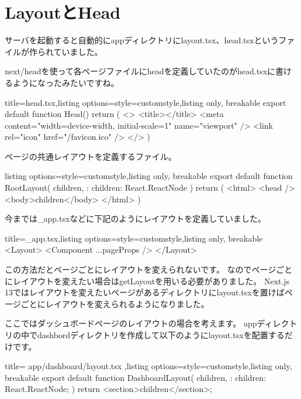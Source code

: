 \section{LayoutとHead}

サーバを起動すると自動的にappディレクトリにlayout.tsx、head.tsxというファイルが作られていました。

next/headを使って各ページファイルにheadを定義していたのがhead.tsxに書けるようになったみたいですね。

\begin{tcblisting}{title={head.tsx},listing options={style=customstyle},listing only, breakable}
  export default function Head() {
      return (
      <>
        <title></title>
        <meta content="width=device-width, initial-scale=1" name="viewport" />
        <link rel="icon" href="/favicon.ico" />
      </>
      )
    }
\end{tcblisting}



ページの共通レイアウトを定義するファイル。




\begin{tcblisting}{listing options={style=customstyle},listing only, breakable}
  export default function RootLayout({
      children,
    }: {
  children: React.ReactNode
  }) {
      return (
      <html>
        <head />
        <body>{children}</body>
      </html>
      )
    }

\end{tcblisting}


今までは\_app.tsxなどに下記のようにレイアウトを定義していました。
\begin{tcblisting}{title={\_app.tsx},listing options={style=customstyle},listing only, breakable}
  <Layout>
    <Component {...pageProps} />
  </Layout>
\end{tcblisting}




この方法だとページごとにレイアウトを変えられないです。
なのでページごとにレイアウトを変えたい場合はgetLayoutを用いる必要がありました。
Next.js 13ではレイアウトを変えたいページがあるディレクトリにlayout.tsxを置けばページごとにレイアウトを変えられるようになりました。


ここではダッシュボードページのレイアウトの場合を考えます。
appディレクトリの中でdashbordディレクトリを作成して以下のようにlayout.tsxを配置するだけです。



\begin{tcblisting}{title={
        app/dashboard/layout.tsx
      },listing options={style=customstyle},listing only, breakable}
  export default function DashboardLayout({
      children,
    }: {
  children: React.ReactNode;
  }) {
      return <section>{children}</section>;
    }

\end{tcblisting}




